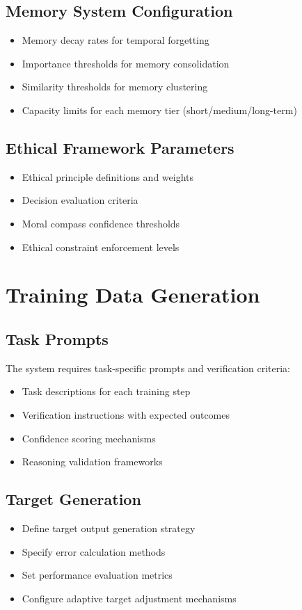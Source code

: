 \documentclass[11pt,a4paper]{article}
\begin{document}
\subsection{Memory System Configuration}
\begin{itemize}[leftmargin=0.5in]
    \item Memory decay rates for temporal forgetting
    \item Importance thresholds for memory consolidation
    \item Similarity thresholds for memory clustering
    \item Capacity limits for each memory tier (short/medium/long-term)
\end{itemize}

\subsection{Ethical Framework Parameters}
\begin{itemize}[leftmargin=0.5in]
    \item Ethical principle definitions and weights
    \item Decision evaluation criteria
    \item Moral compass confidence thresholds
    \item Ethical constraint enforcement levels
\end{itemize}

\section{Training Data Generation}

\subsection{Task Prompts}
The system requires task-specific prompts and verification criteria:
\begin{itemize}[leftmargin=0.5in]
    \item Task descriptions for each training step
    \item Verification instructions with expected outcomes
    \item Confidence scoring mechanisms
    \item Reasoning validation frameworks
\end{itemize}

\subsection{Target Generation}
\begin{itemize}[leftmargin=0.5in]
    \item Define target output generation strategy
    \item Specify error calculation methods
    \item Set performance evaluation metrics
    \item Configure adaptive target adjustment mechanisms
\end{itemize}
\end{document}
